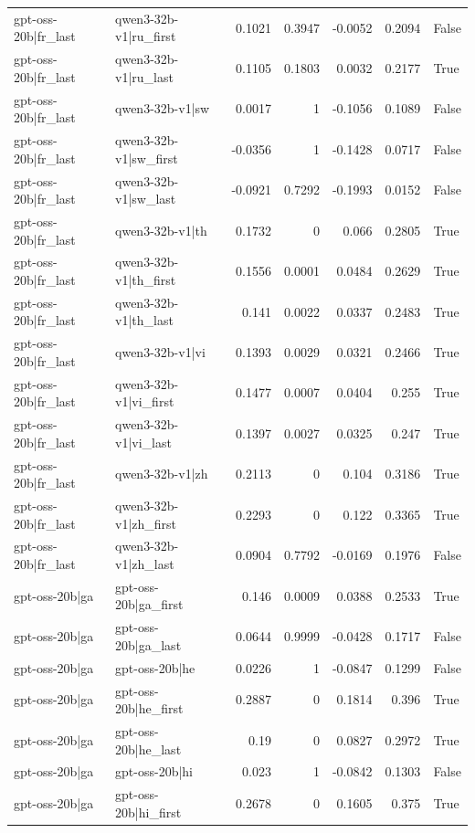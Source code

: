 \begin{table}
\begin{tabular}{l l r r r r l}
gpt-oss-20b|fr_last & qwen3-32b-v1|ru_first & 0.1021 & 0.3947 & -0.0052 & 0.2094 & False \\
gpt-oss-20b|fr_last & qwen3-32b-v1|ru_last & 0.1105 & 0.1803 & 0.0032 & 0.2177 & True \\
gpt-oss-20b|fr_last & qwen3-32b-v1|sw & 0.0017 & 1 & -0.1056 & 0.1089 & False \\
gpt-oss-20b|fr_last & qwen3-32b-v1|sw_first & -0.0356 & 1 & -0.1428 & 0.0717 & False \\
gpt-oss-20b|fr_last & qwen3-32b-v1|sw_last & -0.0921 & 0.7292 & -0.1993 & 0.0152 & False \\
gpt-oss-20b|fr_last & qwen3-32b-v1|th & 0.1732 & 0 & 0.066 & 0.2805 & True \\
gpt-oss-20b|fr_last & qwen3-32b-v1|th_first & 0.1556 & 0.0001 & 0.0484 & 0.2629 & True \\
gpt-oss-20b|fr_last & qwen3-32b-v1|th_last & 0.141 & 0.0022 & 0.0337 & 0.2483 & True \\
gpt-oss-20b|fr_last & qwen3-32b-v1|vi & 0.1393 & 0.0029 & 0.0321 & 0.2466 & True \\
gpt-oss-20b|fr_last & qwen3-32b-v1|vi_first & 0.1477 & 0.0007 & 0.0404 & 0.255 & True \\
gpt-oss-20b|fr_last & qwen3-32b-v1|vi_last & 0.1397 & 0.0027 & 0.0325 & 0.247 & True \\
gpt-oss-20b|fr_last & qwen3-32b-v1|zh & 0.2113 & 0 & 0.104 & 0.3186 & True \\
gpt-oss-20b|fr_last & qwen3-32b-v1|zh_first & 0.2293 & 0 & 0.122 & 0.3365 & True \\
gpt-oss-20b|fr_last & qwen3-32b-v1|zh_last & 0.0904 & 0.7792 & -0.0169 & 0.1976 & False \\
gpt-oss-20b|ga & gpt-oss-20b|ga_first & 0.146 & 0.0009 & 0.0388 & 0.2533 & True \\
gpt-oss-20b|ga & gpt-oss-20b|ga_last & 0.0644 & 0.9999 & -0.0428 & 0.1717 & False \\
gpt-oss-20b|ga & gpt-oss-20b|he & 0.0226 & 1 & -0.0847 & 0.1299 & False \\
gpt-oss-20b|ga & gpt-oss-20b|he_first & 0.2887 & 0 & 0.1814 & 0.396 & True \\
gpt-oss-20b|ga & gpt-oss-20b|he_last & 0.19 & 0 & 0.0827 & 0.2972 & True \\
gpt-oss-20b|ga & gpt-oss-20b|hi & 0.023 & 1 & -0.0842 & 0.1303 & False \\
gpt-oss-20b|ga & gpt-oss-20b|hi_first & 0.2678 & 0 & 0.1605 & 0.375 & True \\

\end{tabular}
\end{table}
